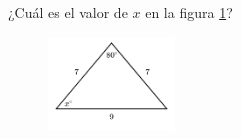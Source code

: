 \question[15]  ¿Cuál es el valor de $x$ en la figura \ref{fig:findangle08}?
\begin{figure}[H]
    \begin{center}
        \includegraphics[width=0.3\textwidth]{../images/findangle08.png}
    \end{center}
    \caption{}
    \label{fig:findangle08}
\end{figure}